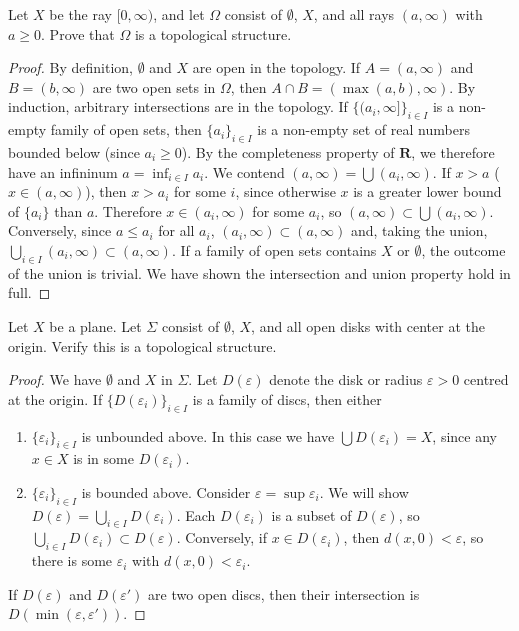 \begin{exercise}
    Let $X$ be the ray $[0,\infty)$, and let $\Omega$ consist of $\emptyset$, $X$, and all rays $(a,\infty)$ with $a \geq 0$. Prove that $\Omega$ is a topological structure.
\end{exercise}
\begin{proof}
    By definition, $\emptyset$ and $X$ are open in the topology. If $A = (a, \infty)$ and $B = (b, \infty)$ are two open sets in $\Omega$, then $A \cap B = (\max(a,b), \infty)$. By induction, arbitrary intersections are in the topology. If $\{(a_i, \infty]\}_{i \in I}$ is a non-empty family of open sets, then $\{a_i\}_{i \in I}$ is a non-empty set of real numbers bounded below (since $a_i \geq 0$). By the completeness property of $\mathbf{R}$, we therefore have an infininum $a = \inf_{i \in I} a_i$. We contend $(a, \infty) = \bigcup (a_i, \infty)$. If $x > a$ ($x \in (a,\infty)$), then $x > a_i$ for some $i$, since otherwise $x$ is a greater lower bound of $\{a_i\}$ than $a$. Therefore $x \in (a_i, \infty)$ for some $a_i$, so $(a,\infty) \subset \bigcup (a_i,\infty)$. Conversely, since $a \leq a_i$ for all $a_i$, $(a_i,\infty) \subset (a, \infty)$ and, taking the union, $\bigcup_{i \in I} (a_i, \infty) \subset (a, \infty)$. If a family of open sets contains $X$ or $\emptyset$, the outcome of the union is trivial. We have shown the intersection and union property hold in full.
\end{proof}

\begin{exercise}
    Let $X$ be a plane. Let $\Sigma$ consist of $\emptyset$, $X$, and all open disks with center at the origin. Verify this is a topological structure.
\end{exercise}
\begin{proof}
    We have $\emptyset$ and $X$ in $\Sigma$. Let $D(\varepsilon)$ denote the disk or radius $\varepsilon > 0$ centred at the origin. If $\{D(\varepsilon_i)\}_{i \in I}$ is a family of discs, then either
    \begin{enumerate}
        \item $\{\varepsilon_i\}_{i \in I}$ is unbounded above. In this case we have $\bigcup D(\varepsilon_i) = X$, since any $x \in X$ is in some $D(\varepsilon_i)$.
        \item $\{\varepsilon_i\}_{i \in I}$ is bounded above. Consider $\varepsilon = \sup \varepsilon_i$. We will show $D(\varepsilon) = \bigcup_{i \in I} D(\varepsilon_i)$. Each $D(\varepsilon_i)$ is a subset of $D(\varepsilon)$, so $\bigcup_{i \in I} D(\varepsilon_i) \subset D(\varepsilon)$. Conversely, if $x \in D(\varepsilon_i)$, then $d(x,0) < \varepsilon$, so there is some $\varepsilon_i$ with $d(x,0) < \varepsilon_i$.
    \end{enumerate}
    If $D(\varepsilon)$ and $D(\varepsilon')$ are two open discs, then their intersection is $D(\min(\varepsilon, \varepsilon'))$.
\end{proof}

